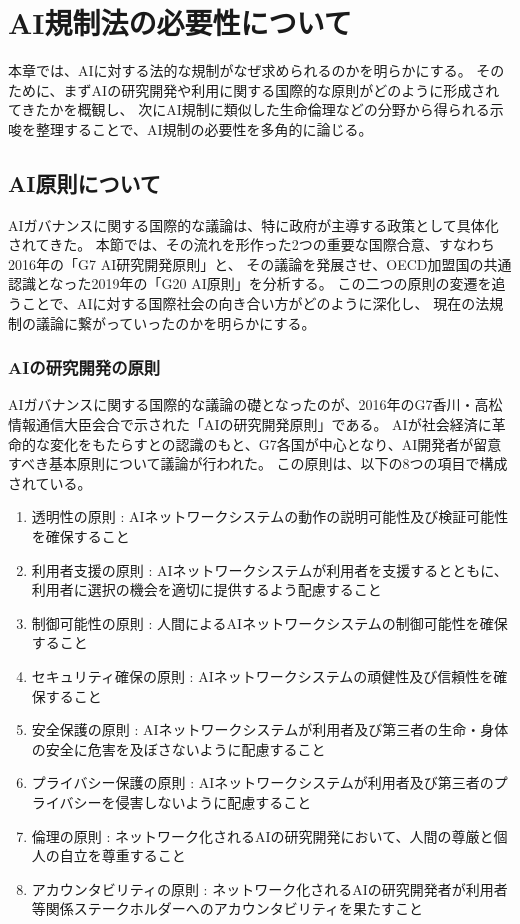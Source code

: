\chapter{AI規制法の必要性について}
本章では、AIに対する法的な規制がなぜ求められるのかを明らかにする。
そのために、まずAIの研究開発や利用に関する国際的な原則がどのように形成されてきたかを概観し、
次にAI規制に類似した生命倫理などの分野から得られる示唆を整理することで、AI規制の必要性を多角的に論じる。

\section{AI原則について} %
AIガバナンスに関する国際的な議論は、特に政府が主導する政策として具体化されてきた。
本節では、その流れを形作った2つの重要な国際合意、すなわち2016年の「G7 AI研究開発原則」と、
その議論を発展させ、OECD加盟国の共通認識となった2019年の「G20 AI原則」を分析する。
この二つの原則の変遷を追うことで、AIに対する国際社会の向き合い方がどのように深化し、
現在の法規制の議論に繋がっていったのかを明らかにする。

\subsection{AIの研究開発の原則} 
AIガバナンスに関する国際的な議論の礎となったのが、2016年のG7香川・高松情報通信大臣会合で示された「AIの研究開発原則」である。
AIが社会経済に革命的な変化をもたらすとの認識のもと、G7各国が中心となり、AI開発者が留意すべき基本原則について議論が行われた。
この原則は、以下の8つの項目で構成されている。

\begin{enumerate}
  \item 透明性の原則 : AIネットワークシステムの動作の説明可能性及び検証可能性を確保すること
  \item 利用者支援の原則 : AIネットワークシステムが利用者を支援するとともに、利用者に選択の機会を適切に提供するよう配慮すること
  \item 制御可能性の原則 : 人間によるAIネットワークシステムの制御可能性を確保すること
  \item セキュリティ確保の原則 : AIネットワークシステムの頑健性及び信頼性を確保すること
  \item 安全保護の原則 : AIネットワークシステムが利用者及び第三者の生命・身体の安全に危害を及ぼさないように配慮すること
  \item プライバシー保護の原則 : AIネットワークシステムが利用者及び第三者のプライバシーを侵害しないように配慮すること
  \item 倫理の原則 : ネットワーク化されるAIの研究開発において、人間の尊厳と個人の自立を尊重すること
  \item アカウンタビリティの原則 : ネットワーク化されるAIの研究開発者が利用者等関係ステークホルダーへのアカウンタビリティを果たすこと
\end{enumerate}

